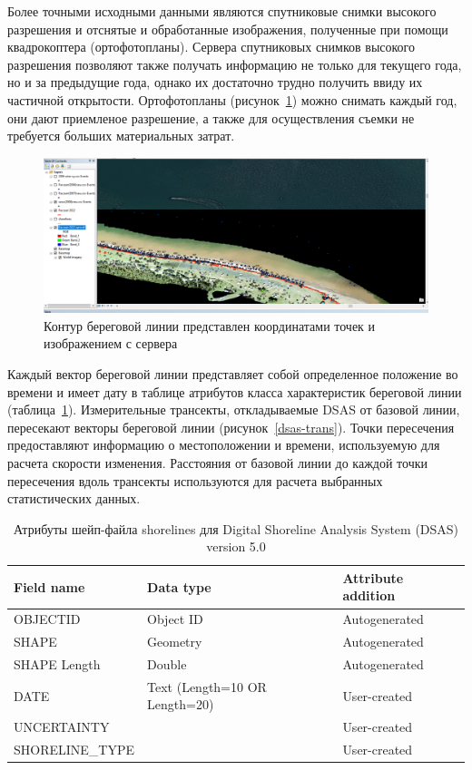 \documentclass[732,fontsize=14pt,final]{studrep}
\begin{document}
Более точными исходными данными являются спутниковые снимки высокого разрешения и отснятые и обработанные изображения, полученные при помощи квадрокоптера (ортофотопланы). Сервера спутниковых снимков высокого разрешения позволяют также получать информацию не только для текущего года, но и за предыдущие года, однако их достаточно трудно получить ввиду их частичной открытости. Ортофотопланы (рисунок~\ref{ortho-src}) можно снимать каждый год, они дают приемленое разрешение, а также для осуществления съемки не требуется больших материальных затрат.

\begin{figure}[htp]
  \centering
  \includegraphics[width=\linewidth]{pics/image12.png}
  \caption{Контур береговой линии представлен координатами точек и изображением с сервера}\label{ortho-src}
\end{figure}

Каждый вектор береговой линии представляет собой определенное положение во времени и имеет дату в таблице атрибутов класса характеристик береговой линии (таблица~\ref{tbl:struct}). Измерительные трансекты, откладываемые DSAS от базовой линии, пересекают векторы береговой линии (рисунок~\ref{dsas-trans}). Точки пересечения предоставляют информацию о местоположении и времени, используемую для расчета скорости изменения. Расстояния от базовой линии до каждой точки пересечения вдоль трансекты используются для расчета выбранных статистических данных.

\begin{table}
  \caption{Атрибуты шейп-файла shorelines для Digital Shoreline Analysis System (DSAS) version 5.0}\label{tbl:struct}
  \centering
  \begin{tabular}{|l|l|l|}
    \hline 
    Field name &	Data type &	Attribute addition\\\hline 
    OBJECTID	& Object ID	& Autogenerated\\
    SHAPE & 	Geometry	& Autogenerated\\
    SHAPE Length	& Double	& Autogenerated\\
    DATE	& Text (Length=10 OR Length=20)& User-created	\\
    UNCERTAINTY	& &	User-created	\\
    SHORELINE\_TYPE	& &	User-created\\
    \hline
  \end{tabular}
\end{table}
\end{document}
